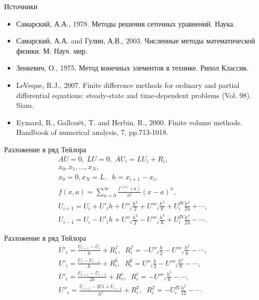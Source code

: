 \documentclass[12pt]{beamer}
\begin{document}
\begin{frame}{Источники}
    \begin{itemize}
        \item Самарский, А.А., 1978. Методы решения сеточных уравнений. Наука.
        \item Самарский, А.А. and Гулин, А.В., 2003. Численные методы математической физики. М: Науч. мир.
        \item Зенкевич, О., 1975. Метод конечных элементов в технике. Рипол Классик.
        \item LeVeque, R.J., 2007. Finite difference methods for ordinary and partial differential equations: steady-state and time-dependent problems (Vol. 98). Siam.
        \item Eymard, R., Gallouët, T. and Herbin, R., 2000. Finite volume methods. Handbook of numerical analysis, 7, pp.713-1018.
    \end{itemize}
\end{frame}

\begin{frame}{Разложение в ряд Тейлора}
    \begin{eqnarray}
        AU=0,\; LU=0,\; AU_{i}=LU_{i}+R_{i},\\
        x_{0}, x_{1}, \dots, x_N,\\
        x_{0}=0, x_N=L,\;\; h=x_{i+1}-x_{i},\\
        f\left(x, a\right) = \sum\limits_{n=0}^{\infty} \frac{f^{\left(n\right)}\left(a\right)}{n!} \left(x - a\right)^n,\\
        U_{i+1}=U_{i}+U'_{i}h+U''_{i}\frac{h^2}{2}+U'''_{i}\frac{h^3}{6}+U^{IV}_{i}\frac{h^4}{24}+\cdots,\\
        U_{i-1}=U_{i}-U'_{i}h+U''_{i}\frac{h^2}{2}-U'''_{i}\frac{h^3}{6}+U^{IV}_{i}\frac{h^4}{24}-\cdots.
    \end{eqnarray}
\end{frame}

\begin{frame}{Разложение в ряд Тейлора}
    \begin{eqnarray}
        U'_{i}=\frac{U_{i+1}-U_{i}}{h}+R^f_{i},\;\; R^f_{i}=-U''_{i}\frac{h}{2}-U'''_{i}\frac{h^2}{6}-\cdots,\\
        U'_{i}=\frac{U_{i}-U_{i-1}}{h}+R^b_{i},\;\; R^b_{i}=U''_{i}\frac{h}{2}-U'''_{i}\frac{h^2}{6}-\cdots,\\
        U'_{i}=\frac{U_{i+1}-U_{i-1}}{2h}+R^c_{i},\;\; R^c_{i}=-U'''_{i}\frac{h^2}{6}-\cdots,\\
        U''_{i}=\frac{U_{i+1}-2U{i}+U_{i-1}}{h^2}+R^2_{i},\;\; R^2_{i}=-U^{IV}_{i}\frac{h^2}{12}-\cdots.
    \end{eqnarray}
\end{frame}
\end{document}
